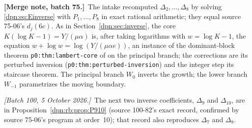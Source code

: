 \documentclass[11pt]{article}
\numberwithin{equation}{section}
\theoremstyle{definition}\newtheorem{definition}[theorem]{Definition}
\theoremstyle{remark}\newtheorem{remark}[theorem]{Remark}
\newcommand{\mergenoteb}[1]{\par\smallskip\noindent\textbf{[Merge note, batch 75.]}\ #1\par\smallskip}
\newcommand{\writenoted}[1]{\par\smallskip\noindent\textit{[Batch 100, 5 October 2026.]}\ #1\par\smallskip}
\begin{document}
\mergenoteb{The intake recomputed $\Delta_2,\dots,\Delta_8$ by solving
\eqref{dpn:eq:Einverse} with $P_1,\dots,P_8$ in exact rational arithmetic; they
equal source 75-06's $d_j(6c)$.  As in Section~\ref{dpn:sec:inverse}, the core
$K(\log K-1)=Y/(\mu\alpha)$ is, after taking logarithms with
$w=\log K-1$, the equation $w+\log w=\log(Y/(\mu\alpha e))$, an instance of the
dominant-block theorem \texttt{p0:thm:lambert-core} of \cite{tai} on the
principal branch; the corrections are its perturbed inversion
(\texttt{p0:thm:perturbed-inversion}) and the integer step its staircase
theorem.  The principal branch $W_0$ inverts the growth; the lower branch
$W_{-1}$ parametrizes the moving boundary.}
\writenoted{The next two inverse coefficients, $\Delta_9$ and $\Delta_{10}$, are
in Proposition~\ref{dpn:rb:prop:P910} (source 100-82's exact record, confirmed by
source 75-06's program at order~10); that record also reproduces $\Delta_7$ and
$\Delta_8$.}
\end{document}
